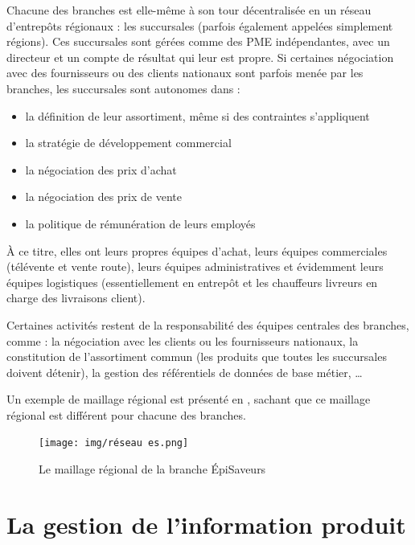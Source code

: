             Chacune des branches est elle-même à son tour décentralisée en un réseau d'entrepôts régionaux : les succursales (parfois également appelées simplement \og régions\fg).
            Ces succursales sont gérées comme des PME indépendantes, avec un directeur et un compte de résultat qui leur est propre.
            Si certaines négociation avec des fournisseurs ou des clients nationaux sont parfois menée par les branches, les succursales sont autonomes dans :
            \begin{itemize}
                \item{la définition de leur assortiment, même si des contraintes s'appliquent}
                \item{la stratégie de développement commercial}
                \item{la négociation des prix d'achat}
                \item{la négociation des prix de vente}
                \item{la politique de rémunération de leurs employés}
            \end{itemize}
            
            \`{A} ce titre, elles ont leurs propres équipes d'achat, leurs équipes commerciales (télévente et vente route), leurs équipes administratives et évidemment leurs équipes logistiques (essentiellement en entrepôt et les chauffeurs livreurs en charge des livraisons client).

            Certaines activités restent de la responsabilité des équipes centrales des branches, comme : la négociation avec les clients ou les fournisseurs nationaux, la constitution de l'assortiment commun (les produits que toutes les succursales doivent détenir), la gestion des référentiels de données de base métier, \dots
            
            Un exemple de maillage régional est présenté en , sachant que ce maillage régional est différent pour chacune des branches.
            \begin{figure}[htpb]
                \begin{center}
                \texttt{[image: img/réseau es.png]}
                \end{center}
                \caption{Le maillage régional de la branche \'{E}piSaveurs}
                \label{fig:reseau_es}
            \end{figure}


    \chapter{La gestion de l'information produit}
    
